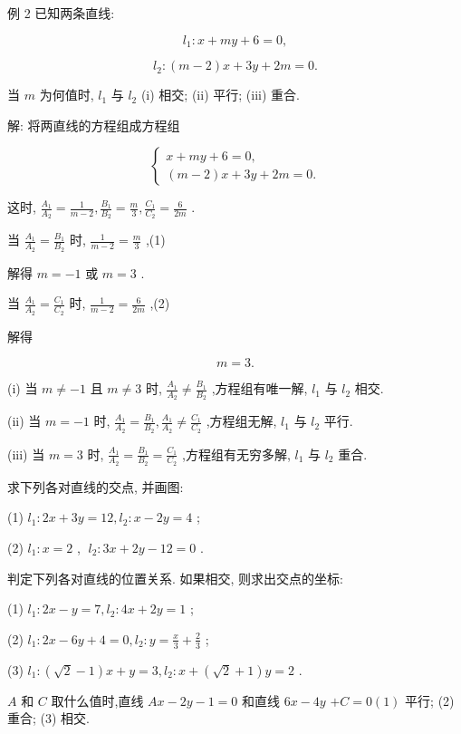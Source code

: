 \documentclass[lang=cn,newtx,10pt,scheme=chinese]{elegantbook}
\begin{document}
例 2 已知两条直线:

\[
    {l}_{1} : x + {my} + 6 = 0,
\]

\[
    {l}_{2} : \left( {m - 2}\right) x + {3y} + {2m} = 0.
\]

当 \(m\) 为何值时, \({l}_{1}\) 与 \({l}_{2}\) (i) 相交; (ii) 平行; (iii) 重合.

解: 将两直线的方程组成方程组

\[
  \left\{ \begin{array}{l} x + {my} + 6 = 0, \\ \left( {m - 2}\right) x + {3y} + {2m} = 0. \end{array}\right.
\]

这时, \(\frac{{A}_{1}}{{A}_{2}} = \frac{1}{m - 2},\frac{{B}_{1}}{{B}_{2}} = \frac{m}{3},\frac{{C}_{1}}{{C}_{2}} = \frac{6}{2m}\) .

当 \(\frac{{A}_{1}}{{A}_{2}} = \frac{{B}_{1}}{{B}_{2}}\) 时, \(\frac{1}{m - 2} = \frac{m}{3}\) ,(1)

解得 \(m = - 1\) 或 \(m = 3\) .

当 \(\frac{{A}_{1}}{{A}_{2}} = \frac{{C}_{1}}{{C}_{2}}\) 时, \(\frac{1}{m - 2} = \frac{6}{2m}\) ,(2)

解得

\[
  m = 3\text{.}
\]

(i) 当 \(m \neq - 1\) 且 \(m \neq 3\) 时, \(\frac{{A}_{1}}{{A}_{2}} \neq \frac{{B}_{1}}{{B}_{2}}\) ,方程组有唯一解, \({l}_{1}\) 与 \({l}_{2}\) 相交.

(ii) 当 \(m = - 1\) 时, \(\frac{{A}_{1}}{{A}_{2}} = \frac{{B}_{1}}{{B}_{2}},\frac{{A}_{1}}{{A}_{2}} \neq \frac{{C}_{1}}{{C}_{2}}\) ,方程组无解, \({l}_{1}\) 与 \({l}_{2}\) 平行.

(iii) 当 \(m = 3\) 时, \(\frac{{A}_{1}}{{A}_{2}} = \frac{{B}_{1}}{{B}_{2}} = \frac{{C}_{1}}{{C}_{2}}\) ,方程组有无穷多解, \({l}_{1}\) 与 \({l}_{2}\) 重合.

\begin{problemset}[练习]

\item 求下列各对直线的交点, 并画图:

(1) \({l}_{1} : {2x} + {3y} = {12},{l}_{2} : x - {2y} = 4\) ;

(2) \({l}_{1} : x = 2\) , \(\;{l}_{2} : {3x} + {2y} - {12} = 0\) .

\item 判定下列各对直线的位置关系. 如果相交, 则求出交点的坐标:

(1) \({l}_{1} : {2x} - y = 7,{l}_{2} : {4x} + {2y} = 1\) ;

(2) \({l}_{1} : {2x} - {6y} + 4 = 0,{l}_{2} : y = \frac{x}{3} + \frac{2}{3}\) ;

(3) \({l}_{1} : \left( {\sqrt{2} - 1}\right) x + y = 3,{l}_{2} : x + \left( {\sqrt{2} + 1}\right) y = 2\) .

\item \(A\) 和 \(C\) 取什么值时,直线 \({Ax} - {2y} - 1 = 0\) 和直线 \({6x} - {4y}\) \(+ C = 0\left( 1\right)\) 平行; (2) 重合; (3) 相交.

\end{problemset}
\end{document}
